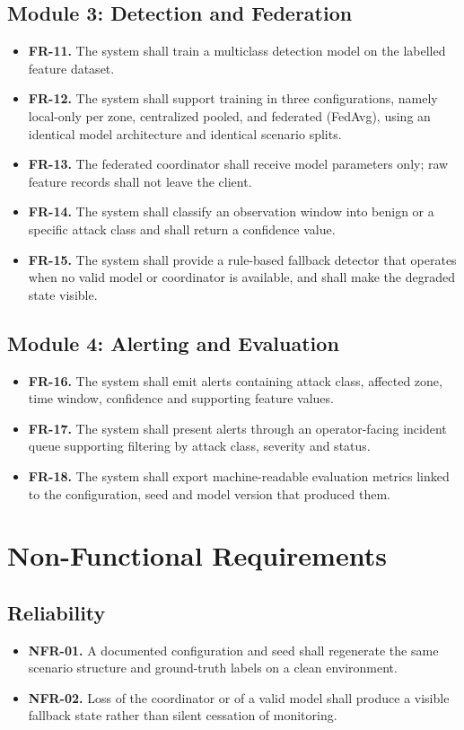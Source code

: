 \subsection{Module 3: Detection and Federation}
\begin{itemize}
\item \textbf{FR-11.} The system shall train a multiclass detection model on the
labelled feature dataset.
\item \textbf{FR-12.} The system shall support training in three configurations,
namely local-only per zone, centralized pooled, and federated (FedAvg), using an identical
model architecture and identical scenario splits.
\item \textbf{FR-13.} The federated coordinator shall receive model parameters only;
raw feature records shall not leave the client.
\item \textbf{FR-14.} The system shall classify an observation window into benign or a
specific attack class and shall return a confidence value.
\item \textbf{FR-15.} The system shall provide a rule-based fallback detector that
operates when no valid model or coordinator is available, and shall make the degraded
state visible.
\end{itemize}

\subsection{Module 4: Alerting and Evaluation}
\begin{itemize}
\item \textbf{FR-16.} The system shall emit alerts containing attack class, affected
zone, time window, confidence and supporting feature values.
\item \textbf{FR-17.} The system shall present alerts through an operator-facing
incident queue supporting filtering by attack class, severity and status.
\item \textbf{FR-18.} The system shall export machine-readable evaluation metrics
linked to the configuration, seed and model version that produced them.
\end{itemize}

\section{Non-Functional Requirements}

\subsection{Reliability}
\begin{itemize}
\item \textbf{NFR-01.} A documented configuration and seed shall regenerate the same
scenario structure and ground-truth labels on a clean environment.
\item \textbf{NFR-02.} Loss of the coordinator or of a valid model shall produce a
visible fallback state rather than silent cessation of monitoring.
\end{itemize}

